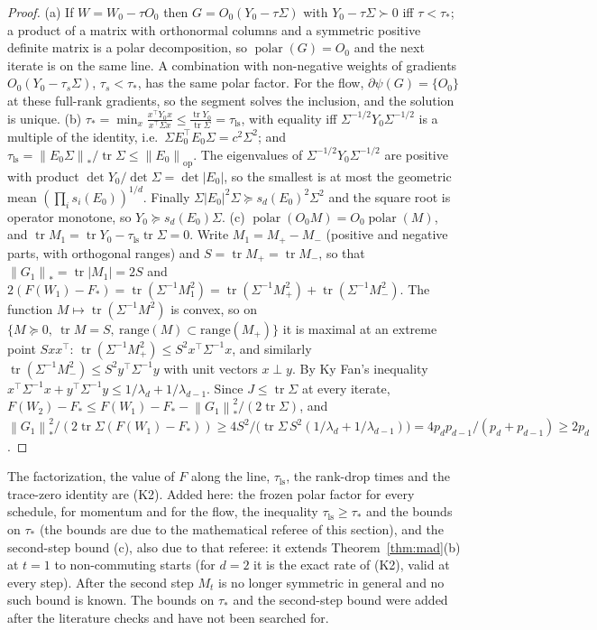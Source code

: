 \documentclass[11pt]{article}
\theoremstyle{definition}
\theoremstyle{remark}
\newcommand{\nop}[1]{\left\|#1\right\|_{\mathrm{op}}}
\newcommand{\nnuc}[1]{\left\|#1\right\|_{*}}
\newcommand{\abs}[1]{\left|#1\right|}
\newcommand{\tr}{\operatorname{tr}}
\newcommand{\polar}{\operatorname{polar}}
\begin{document}
\begin{proof}
(a) If $W=W_0-\tau O_0$ then $G=O_0(Y_0-\tau\Sigma)$ with $Y_0-\tau\Sigma\succ0$ iff $\tau<\tau_\ast$; a product of a matrix
with orthonormal columns and a symmetric positive definite matrix is a polar decomposition, so $\polar(G)=O_0$ and the
next iterate is on the same line. A combination with non-negative weights of gradients $O_0(Y_0-\tau_s\Sigma)$,
$\tau_s<\tau_\ast$, has the same polar factor. For the flow, $\partial\psi(G)=\{O_0\}$ at these full-rank gradients, so
the segment solves the inclusion, and the solution is unique.
(b) $\tau_\ast=\min_x\frac{x^\top Y_0x}{x^\top\Sigma x}\le\frac{\tr Y_0}{\tr\Sigma}=\tau_{\mathrm{ls}}$, with
equality iff $\Sigma^{-1/2}Y_0\Sigma^{-1/2}$ is a multiple of the identity, i.e.\ $\Sigma E_0^\top E_0\Sigma=c^2\Sigma^2$;
and $\tau_{\mathrm{ls}}=\nnuc{E_0\Sigma}/\tr\Sigma\le\nop{E_0}$. The eigenvalues of $\Sigma^{-1/2}Y_0\Sigma^{-1/2}$ are
positive with product $\det Y_0/\det\Sigma=\det\abs{E_0}$, so the smallest is at most the geometric mean
$(\prod_is_i(E_0))^{1/d}$. Finally $\Sigma\abs{E_0}^2\Sigma\succeq s_d(E_0)^2\Sigma^2$ and the square root is operator
monotone, so $Y_0\succeq s_d(E_0)\Sigma$.
(c) $\polar(O_0M)=O_0\polar(M)$, and $\tr M_1=\tr Y_0-\tau_{\mathrm{ls}}\tr\Sigma=0$. Write $M_1=M_+-M_-$ (positive and
negative parts, with orthogonal ranges) and $S=\tr M_+=\tr M_-$, so that $\nnuc{G_1}=\tr\abs{M_1}=2S$ and
$2(F(W_1)-F_\ast)=\tr(\Sigma^{-1}M_1^2)=\tr(\Sigma^{-1}M_+^2)+\tr(\Sigma^{-1}M_-^2)$. The function
$M\mapsto\tr(\Sigma^{-1}M^2)$ is convex, so on $\{M\succeq0,\ \tr M=S,\ \mathrm{range}(M)\subset\mathrm{range}(M_+)\}$ it is
maximal at an extreme point $Sxx^\top$: $\tr(\Sigma^{-1}M_+^2)\le S^2x^\top\Sigma^{-1}x$, and similarly
$\tr(\Sigma^{-1}M_-^2)\le S^2y^\top\Sigma^{-1}y$ with unit vectors $x\perp y$. By Ky Fan's inequality
$x^\top\Sigma^{-1}x+y^\top\Sigma^{-1}y\le1/\lambda_d+1/\lambda_{d-1}$. Since $J\le\tr\Sigma$ at every iterate,
$F(W_2)-F_\ast\le F(W_1)-F_\ast-\nnuc{G_1}^2/(2\tr\Sigma)$, and
$\nnuc{G_1}^2/(2\tr\Sigma(F(W_1)-F_\ast))\ge4S^2/\big(\tr\Sigma\,S^2(1/\lambda_d+1/\lambda_{d-1})\big)
=4p_dp_{d-1}/(p_d+p_{d-1})\ge2p_d$.
\end{proof}

The factorization, the value of $F$ along the line, $\tau_{\mathrm{ls}}$, the rank-drop times and the trace-zero
identity are (K2). Added here: the frozen polar factor for every schedule, for momentum and for the flow, the
inequality $\tau_{\mathrm{ls}}\ge\tau_\ast$ and the bounds on $\tau_\ast$ (the bounds are due to the mathematical referee
of this section), and the second-step bound (c), also due to that referee: it extends
Theorem~\ref{thm:mad}(b) at $t=1$ to non-commuting starts (for $d=2$ it is the exact rate of (K2), valid at every
step). After the second step $M_t$ is no longer symmetric in general and no such bound is known. The bounds on
$\tau_\ast$ and the second-step bound were added after the literature checks and have not been searched for.
\end{document}
